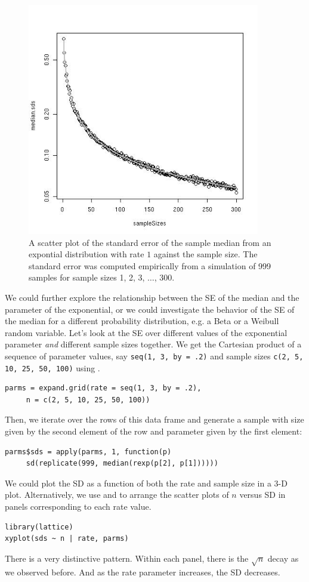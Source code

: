\begin{figure}[htbp]
  \begin{center}
    \leavevmode
     \includegraphics[width=4in]{RNG/images/medianSD.jpg}    
     \caption{A scatter plot of the standard error of the sample
       median from an expontial distribution with rate $1$ against the
      sample size.  The standard error was
       computed empirically from a simulation of 999 samples for
       sample sizes 1, 2, 3, $\ldots$, 300.}
    \label{fig:medianSD}
  \end{center}
\end{figure}

We could further explore the relationship between the SE of the median
and the parameter of the exponential, or we could investigate the
behavior of the SE of the median for a different probability
distribution, e.g. a Beta or a Weibull random variable.  Let's look at
the SE over different values of the exponential parameter \textit{and}
different sample sizes together.  We get the Cartesian product of a
sequence of parameter values, say \verb+seq(1, 3, by = .2)+ and sample
sizes \verb+c(2, 5, 10, 25, 50, 100)+ using .
\begin{verbatim}
parms = expand.grid(rate = seq(1, 3, by = .2), 
     n = c(2, 5, 10, 25, 50, 100))
\end{verbatim}
Then, we iterate over the rows of this data frame
and generate a sample with size given by the second element
of the row and parameter given by the first element:
\begin{verbatim}
parms$sds = apply(parms, 1, function(p) 
     sd(replicate(999, median(rexp(p[2], p[1])))))
\end{verbatim}
We could plot the SD as a function of both the
rate and sample size in a 3-D plot.
Alternatively, we use 
and  to arrange the scatter plots of 
$n$ versus SD  in panels corresponding
to each rate value.
\begin{verbatim}
library(lattice)
xyplot(sds ~ n | rate, parms)
\end{verbatim}
There is a very distinctive pattern.
Within  each panel, there is  the 
$\sqrt{n}$ decay as we observed before.
And as the rate parameter increases,
the SD decreases.

